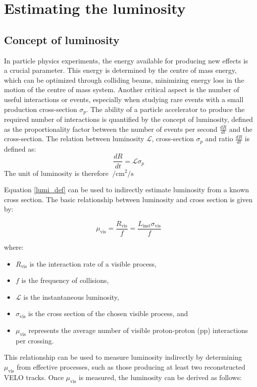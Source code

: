 \chapter{Estimating the luminosity}

\section{Concept of luminosity}
In particle physics experiments, the energy available for producing new effects is a crucial parameter. This energy is determined by the centre of mass energy, which can be optimized through colliding beams, minimizing energy loss in the motion of the centre of mass system. Another critical aspect is the number of useful interactions or events, especially when studying rare events with a small production cross-section $\sigma_p$. The ability of a particle accelerator to produce the required number of interactions is quantified by the concept of luminosity, defined as the proportionality factor between the number of events per second $\tfrac{dR}{dt}$ and the cross-section. The relation between luminosity $\mathcal{L}$, cross-section $\sigma_p$ and ratio $\tfrac{dR}{dt}$ is defined as:
\begin{equation}
    \frac{dR}{dt} = \mathcal{L}{\sigma_p}\label{lumi_def}
\end{equation}
The unit of luminosity is therefore $\SI{}{\per\centi\meter\squared\per\second}$

Equation \ref{lumi_def} can be used to indirectly estimate luminosity from a known cross section. The basic relationship between luminosity and cross section is given by:

\begin{equation}
\mu_{\text{vis}} = \frac{R_{\text{vis}}}{f} = \frac{L_{\text{inst}} \sigma_{\text{vis}}}{f}\label{mu_def}
\end{equation}

where:
\begin{itemize}
\item  $R_{\text{vis}}$ is the interaction rate of a visible process,
\item  $f$ is the frequency of collisions,
\item  $\mathcal{L}$ is the instantaneous luminosity,
\item  $\sigma_{\text{vis}}$ is the cross section of the chosen visible process, and
\item  $\mu_{\text{vis}}$ represents the average number of visible proton-proton (pp) interactions per crossing.
\end{itemize}
This relationship can be used to measure luminosity indirectly by determining \(\mu_{\text{vis}}\) from effective processes, such as those producing at least two reconstructed VELO tracks. Once \(\mu_{\text{vis}}\) is measured, the luminosity can be derived as follows:

